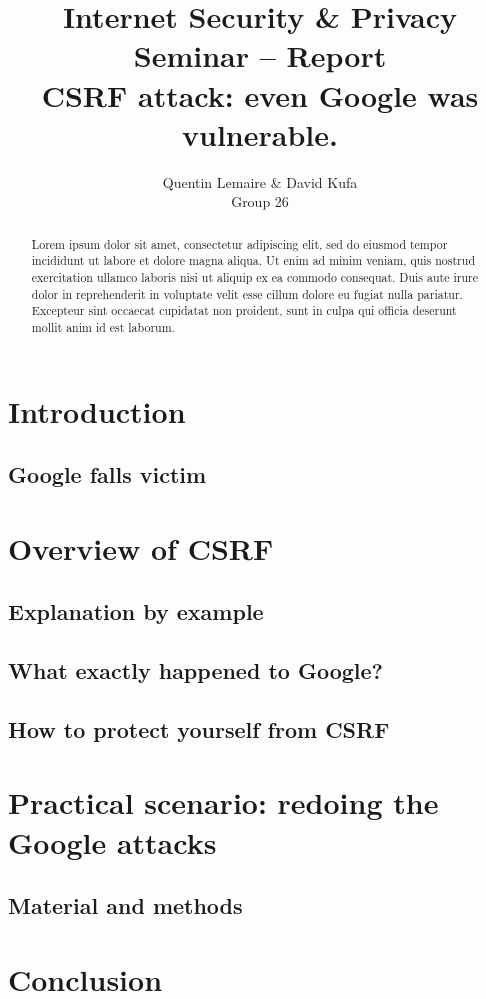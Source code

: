 \documentclass[a4paper,11pt]{article}
\title{Internet Security \& Privacy\\Seminar -- Report\\\vspace{10pt}\textbf{CSRF attack: even Google was vulnerable.}}
\author{Quentin Lemaire \& David Kufa\\Group 26}
\begin{document}
  \maketitle %

  \begin{abstract}
Lorem ipsum dolor sit amet, consectetur adipiscing elit, sed do eiusmod tempor incididunt ut labore et dolore magna aliqua. Ut enim ad minim veniam, quis nostrud exercitation ullamco laboris nisi ut aliquip ex ea commodo consequat. Duis aute irure dolor in reprehenderit in voluptate velit esse cillum dolore eu fugiat nulla pariatur. Excepteur sint occaecat cupidatat non proident, sunt in culpa qui officia deserunt mollit anim id est laborum.
  \end{abstract}


  \section{Introduction}
  
  \subsection{Google falls victim}

  \section{Overview of CSRF}
  
  \subsection{Explanation by example}
  
  \subsection{What exactly happened to Google?}
  
  \subsection{How to protect yourself from CSRF}
  
  \section{Practical scenario: redoing the Google attacks}
  
  \subsection{Material and methods}
  
  \section{Conclusion}
  
  


\end{document}
